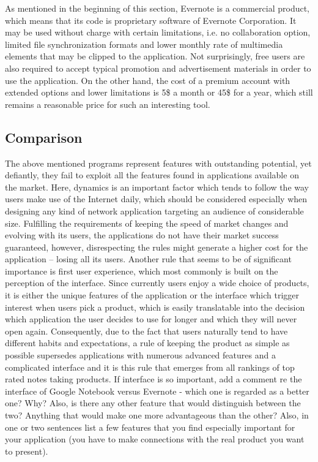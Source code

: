 As mentioned in the beginning of this section, Evernote is a commercial product, which means that its code is proprietary software of Evernote Corporation. It may be used without charge with certain limitations, i.e. no collaboration option, limited file synchronization formats and lower monthly rate of multimedia elements that may be clipped to the application. Not surprisingly, free users are also required to accept typical promotion and advertisement materials in order to use the application. On the other hand, the cost of a premium account with extended options and lower limitations is 5\$ a month or 45\$ for a year, which still remains a reasonable price for such an interesting tool.      
 
\subsection{Comparison}
The above mentioned programs represent features with outstanding potential, yet defiantly, they fail to exploit all the features found in applications available on the market. Here, dynamics is an important factor which tends to follow the way users make use of the Internet daily, which should be considered especially when designing any kind of network application targeting an audience of considerable size. Fulfilling the requirements of keeping the speed of market changes and evolving with its users, the applications do not have their market success guaranteed, however, disrespecting the rules might generate a higher cost for the application -- losing all its users. Another rule that seems to be of significant importance is first user experience, which most commonly is built on the perception of the interface. Since currently users enjoy a wide choice of products, it is either the unique features of the application or the interface which trigger interest when users pick a product, which is easily translatable into the decision which application the user decides to use for longer and which they will never open again. Consequently, due to the fact that users naturally tend to have different habits and expectations, a rule of keeping the product as simple as possible supersedes applications with numerous advanced features and a complicated interface and it is this rule that emerges from all rankings of top rated notes taking products. 
If interface is so important, add a comment re the interface of Google Notebook versus Evernote - which one is regarded as a better one? Why? Also, is there any other feature that would distinguish between the two? Anything that would make one more advantageous than the other? Also, in one or two sentences list a few features that you find especially important for your application (you have to make connections with the real product you want to present).

